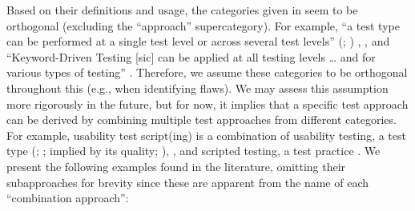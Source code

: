 \ifnotpaper
    \begin{landscape}
        \begin{table*}[hbtp!]
            \ieeeCatsTable{}
        \end{table*}
    \end{landscape}
\fi

Based on their definitions and usage, the categories given in
 seem to be orthogonal (excluding the ``approach''
supercategory). For example, ``a test type can be performed at a single test
level or across several test levels''
\ifnotpaper
    (\citealp[p.~15]{IEEE2022}; \citeyear[p.~7]{IEEE2021})%
\else
    \cite[p.~15]{IEEE2022}, \cite[p.~7]{IEEE2021}%
\fi, and ``Keyword-Driven Testing [sic] can be applied at all testing levels
\dots{} and for various types of testing'' \citeyearpar[p.~4]{IEEE2016}.
Therefore, we assume these categories to be orthogonal throughout this
\docType{} (e.g., when identifying flaws). We may assess this assumption more
rigorously in the future, but for now, it
implies that a specific test approach can be derived by combining multiple
test approaches from different categories. For example, usability test
script(ing) \citepISTQB{} is a combination of usability testing, a test type
\ifnotpaper (\citealp[pp.~22, 26--27]{IEEE2022};
    \citeyear[pp.~7, 40, Tab.~A.1]{IEEE2021}; implied by its quality;
    \citealp[p.~53]{Firesmith2015})\else \cite[pp.~22, 26--27]{IEEE2022},
    \cite[pp.~7, 40, Tab.~A.1]{IEEE2021}\fi, and scripted testing, a test
practice \citep[pp.~20, 22\ifnotpaper; implied by p.~33\fi]{IEEE2022}.
\ifnotpaper We present the following examples found in the literature, omitting
    their subapproaches for brevity since these are apparent from the name of
    each ``combination approach'':

